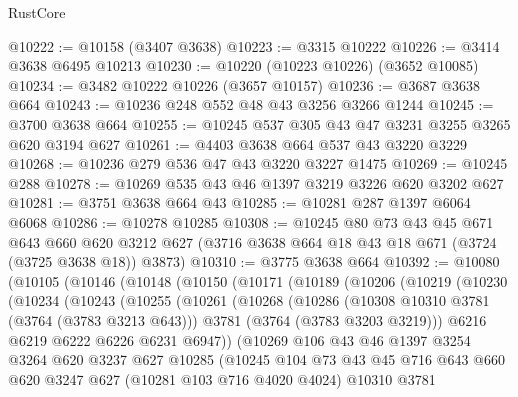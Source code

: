 \begin{lexlean}{RustCore}
\begin{coremodule}
@10222 := @10158 (@3407 @3638)
@10223 := @3315 @10222
@10226 := @3414 @3638 @6495 @10213
@10230 := @10220 (@10223 @10226) (@3652 @10085)
@10234 := @3482 @10222 @10226 (@3657 @10157)
@10236 := @3687 @3638 @664
@10243 := @10236 @248 @552 @48 @43 @3256 @3266 @1244
@10245 := @3700 @3638 @664
@10255 := @10245 @537 @305 @43 @47 @3231 @3255 @3265 @620 @3194 @627
@10261 := @4403 @3638 @664 @537 @43 @3220 @3229
@10268 := @10236 @279 @536 @47 @43 @3220 @3227 @1475
@10269 := @10245 @288
@10278 := @10269 @535 @43 @46 @1397 @3219 @3226 @620 @3202 @627
@10281 := @3751 @3638 @664 @43
@10285 := @10281 @287 @1397 @6064 @6068
@10286 := @10278 @10285
@10308 := @10245
    @80
    @73
    @43
    @45
    @671
    @643
    @660
    @620
    @3212
    @627
    (@3716 @3638 @664 @18 @43 @18 @671 (@3724 (@3725 @3638 @18)) @3873)
@10310 := @3775 @3638 @664
@10392 := @10080
    (@10105
      (@10146
        (@10148
          (@10150
            (@10171
              (@10189
                (@10206
                  (@10219
                    (@10230
                      (@10234
                        (@10243
                          (@10255
                            (@10261
                              (@10268
                                (@10286
                                  (@10308 @10310 @3781 (@3764 (@3783 @3213 @643)))
                                  @3781
                                  (@3764 (@3783 @3203 @3219)))
                                @6216
                                @6219
                                @6222
                                @6226
                                @6231
                                @6947))
                            (@10269
                              @106
                              @43
                              @46
                              @1397
                              @3254
                              @3264
                              @620
                              @3237
                              @627
                              @10285
                              (@10245
                                @104
                                @73
                                @43
                                @45
                                @716
                                @643
                                @660
                                @620
                                @3247
                                @627
                                (@10281 @103 @716 @4020 @4024)
                                @10310
                                @3781

\end{coremodule}
\end{lexlean}

